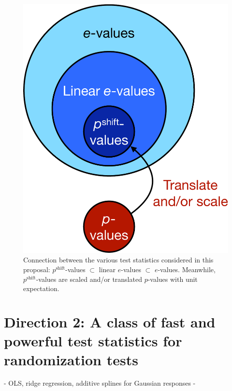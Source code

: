 \documentclass[12pt]{article}
\begin{document}
\begin{figure}
	\centering
	\includegraphics[width=0.4\linewidth]{test_stat_fig_crop}
	\caption{Connection between the various test statistics considered in this proposal: $p^\textrm{shift}$-values $\subset$ linear $e$-values $\subset$ $e$-values. Meanwhile, $p^\textrm{shift}$-values are scaled and/or translated $p$-values with unit expectation.}
	\label{fig:test_stats}
\end{figure}


\section*{Direction 2: A class of fast and powerful test statistics for randomization tests}

- OLS, ridge regression, additive splines for Gaussian responses
- 
\end{document}
